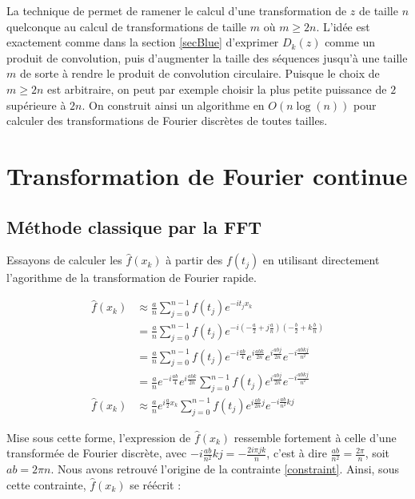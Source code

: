 \documentclass{article}
\begin{document}
La technique de \cite{BLUE} permet de ramener le calcul d'une transformation de $z$ de taille $n$ quelconque au calcul de transformations de taille $m$ où $m \ge 2n$. L'idée est exactement comme dans la section \ref{secBlue} d'exprimer $D_k(z)$ comme un produit de convolution, puis d'augmenter la taille des séquences jusqu'à une taille $m$ de sorte à rendre le produit de convolution circulaire. Puisque le choix de $m\ge 2n$ est arbitraire, on peut par exemple choisir la plus petite puissance de $2$ supérieure à $2n$. On construit ainsi un algorithme en $O(n\log(n))$ pour calculer des transformations de Fourier discrètes de toutes tailles.



\section{Transformation de Fourier continue}

\subsection{Méthode classique par la FFT}

Essayons de calculer les $\hat{f}(x_k)$ à partir des $f(t_j)$ en utilisant directement l'agorithme de la transformation de Fourier rapide.

\begin{align}
  \hat{f}(x_k) &\approx \frac{a}{n}\sum_{j=0}^{n-1}f(t_j)e^{-i t_j x_k} \nonumber\\
         &=\frac{a}{n} \sum_{j=0}^{n-1}f(t_j)e^{-i (-\frac{a}{2}+j\frac{a}{n})(-\frac{b}{2}+k\frac{b}{n})} \nonumber\\
         &=\frac{a}{n} \sum_{j=0}^{n-1}f(t_j)e^{-i\frac{ab}{4}}e^{i\frac{abk}{2n}}e^{i\frac{abj}{2n}}e^{-i\frac{abkj}{n^2}} \nonumber\\
         &=\frac{a}{n} e^{-i\frac{ab}{4}}e^{i\frac{abk}{2n}}\sum_{j=0}^{n-1}f(t_j)e^{i\frac{abj}{2n}}e^{-i\frac{abkj}{n^2}} \nonumber\\
\hat{f}(x_k) &\approx \frac{a}{n} e^{i\frac{a}{2}x_k}\sum_{j=0}^{n-1}f(t_j)e^{i\frac{ab}{2n}j}e^{-i\frac{ab}{n^2}kj}
\label{Fxk}
\end{align}

Mise sous cette forme, l'expression de $\hat{f}(x_k)$ ressemble fortement à celle d'une transformée de Fourier discrète, avec $-i\frac{ab}{n^2}kj = -\frac{2i \pi j k}{n}$, c'est à dire $\frac{ab}{n^2} = \frac{2 \pi}{n}$, soit $ab =2 \pi n$. Nous avons retrouvé l'origine de la contrainte \eqref{constraint}. Ainsi, sous cette contrainte, $\hat{f}(x_k)$ se réécrit :
\end{document}
